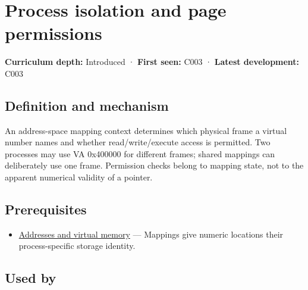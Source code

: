 \hypertarget{appendix-c2a9ad1e2b49}{}\label{referencestart:appendix-c2a9ad1e2b49}
\section{Process isolation and page permissions}\label{appendix-c2a9ad1e2b49-process-isolation-and-page-permissions}

\hypertarget{appendix-c2a9ad1e2b49-process-isolation-and-page-permissions}{}

\textbf{Curriculum depth:} Introduced · \textbf{First seen:} C003 · \textbf{Latest development:} C003

\begin{allmightroledefinition}

\subsection{Definition and mechanism}\label{appendix-c2a9ad1e2b49-definition-and-mechanism}

\hypertarget{appendix-c2a9ad1e2b49-definition-and-mechanism}{}

An address-space mapping context determines which physical frame a virtual number names and whether read/write/execute access is permitted. Two processes may use VA 0x400000 for different frames; shared mappings can deliberately use one frame. Permission checks belong to mapping state, not to the apparent numerical validity of a pointer.

\end{allmightroledefinition}

\subsection{Prerequisites}\label{appendix-c2a9ad1e2b49-prerequisites}

\hypertarget{appendix-c2a9ad1e2b49-prerequisites}{}

\begin{itemize}
\tightlist
\item
  \hyperref[appendix-18ee4f913c3c]{Addresses and virtual memory} --- Mappings give numeric locations their process-specific storage identity.
\end{itemize}

\subsection{Used by}\label{appendix-c2a9ad1e2b49-used-by}

